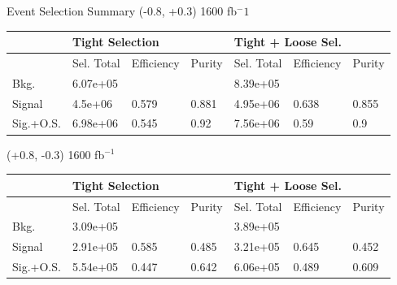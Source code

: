 \documentclass[10pt]{beamer}
\begin{document}
\begin{frame}{Event Selection Summary}
 \tiny
 (-0.8, +0.3) 1600 fb${^-1}$\\
 \begin{tabular}{ |p{}|p{}p{}|p{}|p{}p{}p{}|} 
 \hline 
   &  \multicolumn{3}{|l|}{Tight Selection} &  \multicolumn{3}{|l|}{ Tight + Loose Sel.}  \\  \hline  
 & Sel. Total & Efficiency & Purity & Sel. Total & Efficiency & Purity \\ 
 \hline  
 Bkg. & 6.07e+05 & & & 8.39e+05 & &  \\ 
 Signal & 4.5e+06 & 0.579 & 0.881 & 4.95e+06 & 0.638 & 0.855 \\ 
 Sig.+O.S. & 6.98e+06 & 0.545 & 0.92 & 7.56e+06 & 0.59 & 0.9 \\ 
\hline 
\end{tabular} 

(+0.8, -0.3) 1600 fb$^{-1}$\\
 \begin{tabular}{ |p{}|p{}p{}|p{}|p{}p{}p{}|} 
 \hline 
   &  \multicolumn{3}{|l|}{Tight Selection} &  \multicolumn{3}{|l|}{ Tight + Loose Sel.}  \\  \hline  
 & Sel. Total & Efficiency & Purity & Sel. Total & Efficiency & Purity \\ 
 \hline  
 Bkg. & 3.09e+05 & & & 3.89e+05 & &  \\ 
 Signal & 2.91e+05 & 0.585 & 0.485 & 3.21e+05 & 0.645 & 0.452 \\ 
 Sig.+O.S. & 5.54e+05 & 0.447 & 0.642 & 6.06e+05 & 0.489 & 0.609 \\ 
\hline 
\end{tabular} 


\end{frame}
\end{document}
